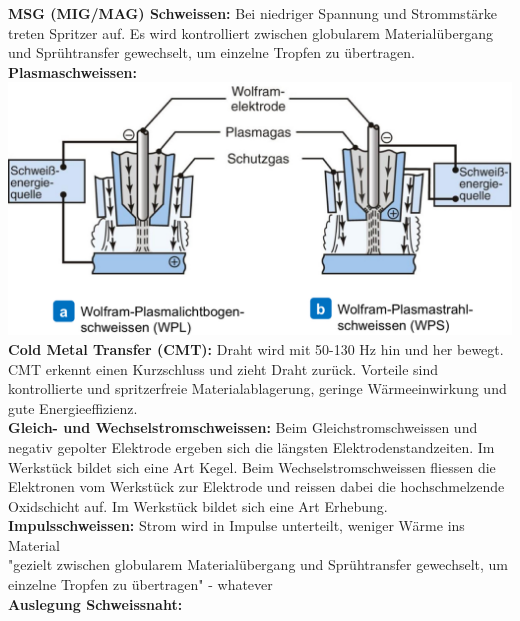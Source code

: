 \textbf{MSG (MIG/MAG) Schweissen:} Bei niedriger Spannung und Strommstärke 
treten Spritzer auf. Es wird kontrolliert zwischen globularem Materialübergang 
und Sprühtransfer gewechselt, um einzelne Tropfen zu übertragen. \\

\textbf{Plasmaschweissen:}\\
\includegraphics[width=0.8\linewidth]{src/images/WP.jpeg}\\

\textbf{Cold Metal Transfer (CMT):} Draht wird mit 50-130 Hz hin und 
her bewegt. CMT erkennt einen Kurzschluss und zieht Draht zurück. 
Vorteile sind kontrollierte und spritzerfreie Materialablagerung, 
geringe Wärmeeinwirkung und gute Energieeffizienz.\\

\textbf{Gleich- und Wechselstromschweissen:} Beim Gleichstromschweissen 
und negativ gepolter Elektrode ergeben sich die längsten 
Elektrodenstandzeiten. Im Werkstück bildet sich eine Art Kegel. 
Beim Wechselstromschweissen fliessen die Elektronen vom Werkstück 
zur Elektrode und reissen dabei die hochschmelzende Oxidschicht auf. 
Im Werkstück bildet sich eine Art Erhebung.\\

\textbf{Impulsschweissen:} Strom wird in Impulse unterteilt, weniger Wärme ins Material\\
"gezielt zwischen
globularem Materialübergang und Sprühtransfer
gewechselt, um einzelne Tropfen zu übertragen" - whatever\\

\textbf{Auslegung Schweissnaht:}\\


